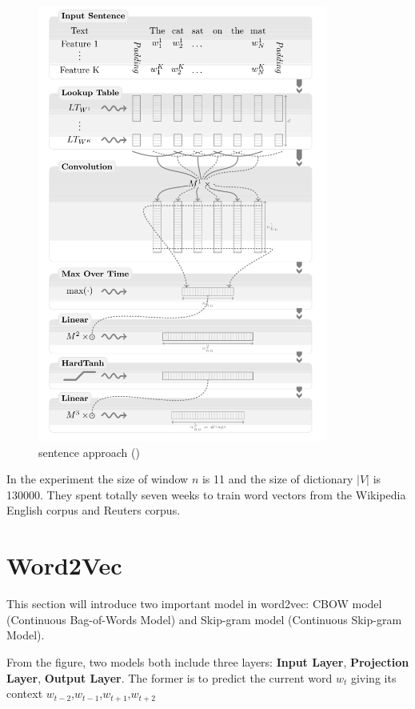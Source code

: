 \begin{figure}[H]
\begin{minipage}{.5\textwidth}
	\includegraphics[width=0.85\textwidth]{cw2}
	\caption{sentence approach (\citep{collobert2011natural})}
	\label{fig:cw2}
\end{minipage}
\end{figure}

In the experiment the size of window $n$ is 11 and the size of dictionary $|V|$ is 130000. They spent totally seven weeks to train word vectors from the Wikipedia English corpus and Reuters corpus.

\section{Word2Vec}
This section will introduce two important model in word2vec: CBOW model (Continuous Bag-of-Words Model) and Skip-gram model (Continuous Skip-gram Model). 

From the figure, two models both include three layers: \textbf{Input Layer}, \textbf{Projection Layer}, \textbf{Output Layer}. The former is to predict the current word $w_t$ giving its context $w_{t-2}$,$w_{t-1}$,$w_{t+1}$,$w_{t+2}$


